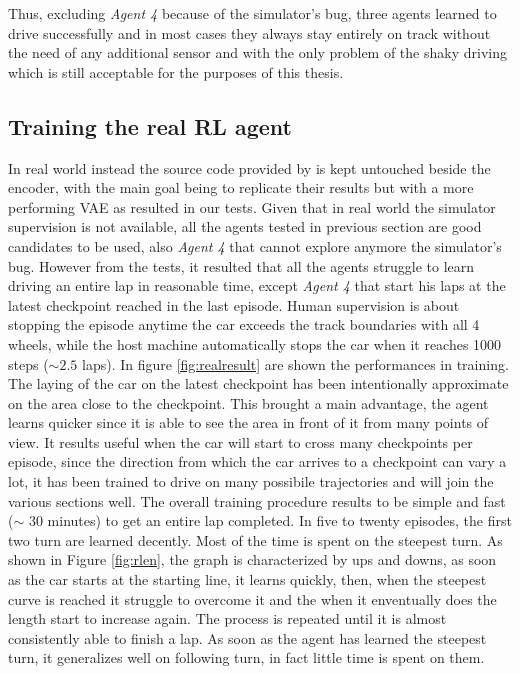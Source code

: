 Thus, excluding\textit{ Agent 4 }because of the simulator's bug, three agents learned to drive successfully and in most cases they always stay entirely on track without the need of any additional sensor and with the only problem of the shaky driving which is still acceptable for the purposes of this thesis.

\subsection{Training the real RL agent}
In real world instead the source code provided by \citet{DBLP:journals/corr/abs-2008-00715} is kept untouched beside the encoder, with the main goal being to replicate their results but with a more performing VAE as resulted in our tests. Given that in real world the simulator supervision is not available, all the agents tested in previous section are good candidates to be used, also \textit{Agent 4} that cannot explore anymore the simulator's bug. However from the tests, it resulted that all the agents struggle to learn driving an entire lap in reasonable time, except\textit{ Agent 4 }that start his laps at the latest checkpoint reached in the last episode. Human supervision is about stopping the episode anytime the car exceeds the track boundaries with all 4 wheels, while the host machine automatically stops the car when it reaches 1000 steps ($\sim 2.5$ laps). In figure \ref{fig:realresult} are shown the performances in training. The laying of the car on the latest checkpoint has been intentionally approximate on the area close to the checkpoint. This brought a main advantage, the agent learns quicker since it is able to see the area in front of it from many points of view. It results useful when the car will start to cross many checkpoints per episode, since the direction from which the car arrives to a checkpoint can vary a lot, it has been trained to drive on many possibile trajectories and will join the various sections well. The overall training procedure results to be simple and fast ($\sim$ 30 minutes) to get an entire lap completed. In five to twenty episodes, the first two turn are learned decently. Most of the time is spent on the steepest turn. As shown in Figure \ref{fig:rlen}, the graph is characterized by ups and downs, as soon as the car starts at the starting line, it learns quickly, then, when the steepest curve is reached it struggle to overcome it and the when it enventually does the length start to increase again. The process is repeated until it is almost consistently able to finish a lap. As soon as the agent has learned the steepest turn, it generalizes well on following turn, in fact little time is spent on them.

